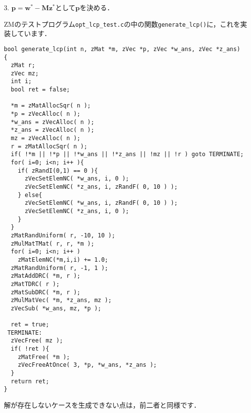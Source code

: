 ﻿\documentclass[a4paper]{jsarticle}
\begin{document}
3. $\boldsymbol{p}=\boldsymbol{w}^{*}-\boldsymbol{M}\boldsymbol{z}^{*}$として$\boldsymbol{p}$を決める．

ZMのテストプログラム\verb|opt_lcp_test.c|の中の関数\verb|generate_lcp()|に，これを実装しています．
\begin{verbatim}
bool generate_lcp(int n, zMat *m, zVec *p, zVec *w_ans, zVec *z_ans)
{
  zMat r;
  zVec mz;
  int i;
  bool ret = false;

  *m = zMatAllocSqr( n );
  *p = zVecAlloc( n );
  *w_ans = zVecAlloc( n );
  *z_ans = zVecAlloc( n );
  mz = zVecAlloc( n );
  r = zMatAllocSqr( n );
  if( !*m || !*p || !*w_ans || !*z_ans || !mz || !r ) goto TERMINATE;
  for( i=0; i<n; i++ ){
    if( zRandI(0,1) == 0 ){
      zVecSetElemNC( *w_ans, i, 0 );
      zVecSetElemNC( *z_ans, i, zRandF( 0, 10 ) );
    } else{
      zVecSetElemNC( *w_ans, i, zRandF( 0, 10 ) );
      zVecSetElemNC( *z_ans, i, 0 );
    }
  }
  zMatRandUniform( r, -10, 10 );
  zMulMatTMat( r, r, *m );
  for( i=0; i<n; i++ )
    zMatElemNC(*m,i,i) += 1.0;
  zMatRandUniform( r, -1, 1 );
  zMatAddDRC( *m, r );
  zMatTDRC( r );
  zMatSubDRC( *m, r );
  zMulMatVec( *m, *z_ans, mz );
  zVecSub( *w_ans, mz, *p );

  ret = true;
 TERMINATE:
  zVecFree( mz );
  if( !ret ){
    zMatFree( *m );
    zVecFreeAtOnce( 3, *p, *w_ans, *z_ans );
  }
  return ret;
}
\end{verbatim}

解が存在しないケースを生成できない点は，前二者と同様です．
\end{document}
